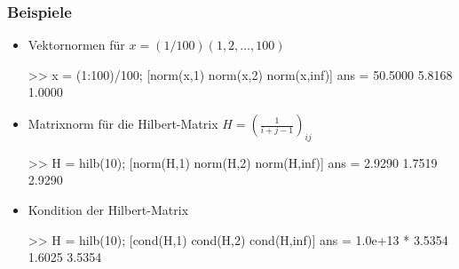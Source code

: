 \documentclass[hyperref={xetex}]{beamer}
\begin{document}
% 
%
\begin{frame}[fragile]\frametitle{Beispiele}
\begin{itemize}
\item Vektornormen für $x=(1/100) (1, 2, \dots, 100)$
\begin{matlabin}
>> x = (1:100)/100; [norm(x,1) norm(x,2) norm(x,inf)]
ans =   50.5000    5.8168    1.0000
\end{matlabin}
\item Matrixnorm für die Hilbert-Matrix $H=(\frac{1}{i+j-1})_{ij}$
\begin{matlabin}
>> H = hilb(10); [norm(H,1) norm(H,2) norm(H,inf)]
ans =    2.9290    1.7519    2.9290
\end{matlabin}
\item Kondition der Hilbert-Matrix
\begin{matlabin}
>> H = hilb(10); [cond(H,1) cond(H,2) cond(H,inf)]
ans =
   1.0e+13 *
    3.5354    1.6025    3.5354
\end{matlabin}
\end{itemize}
\end{frame}
\end{document}
